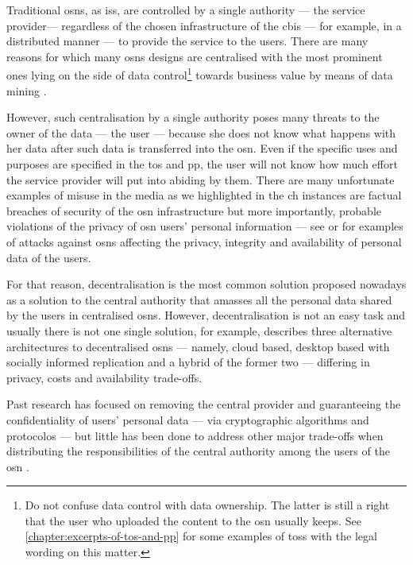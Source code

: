 \documentclass[showtrims, oldfontcommands]{kthesis}
\makeatletter
\newcommand\firstToLow[1]{%
 {%
   \renewcommand{\mfirstucMakeUppercase}{\MakeLowercase}%
   \makefirstuc{#1}%
 }%
}
\newcommand*{\lcnameref}[1]{%
 \begingroup 
   \let\label\@gobble
   \NR@setref{#1}\lc@thirdoffive{#1}%
  \endgroup
}
\newcommand{\lc@thirdoffive}[5]{\firstToLow{#3}}
\makeatother
\begin{document}
Traditional \acp{osn}, as \acp{is}, are controlled by a single authority --- the 
service provider--- regardless of the chosen infrastructure of the \ac{cbis} --- 
for example, in a distributed manner --- to provide the service to the users. There 
are many reasons for which many \acp{osn} designs are centralised with the most 
prominent ones lying on the side of data control\footnote{Do not confuse data control 
with data ownership. The latter is still a right that the user who uploaded the content 
to the \ac{osn} usually keeps. See \cref{chapter:excerpts-of-tos-and-pp} for some 
examples of \acp{tos} with the legal wording on this matter.} towards business value 
by means of data mining \cite{DomingosR01}.

However, such centralisation by a single authority poses many threats to the owner 
of the data --- the user --- because she does not know what happens with her data 
after such data is transferred into the \ac{osn}. Even if the specific uses and 
purposes are specified in the \ac{tos} and \ac{pp}, the user will not know how much 
effort the service provider will put into abiding by them. There are many unfortunate 
examples of misuse in the media as we highlighted in the \lcnameref{chapter:introduction}.
Such instances are factual breaches of security of the \ac{osn} infrastructure but 
more importantly, probable violations of the privacy of \ac{osn} users' personal 
information --- see \cite{CutilloMS10} or \cite{GaoHHWC11} for examples of attacks 
against \acp{osn} affecting the privacy, integrity and availability of personal 
data of the users.

For that reason, decentralisation is the most common solution proposed nowadays 
as a solution to the central authority that amasses all the personal data shared 
by the users in centralised \acp{osn}. However, decentralisation is not an easy 
task and usually there is not one single solution, for example, \cite{ShakimovVCC09} 
describes three alternative architectures to decentralised \acp{osn} --- namely, 
cloud based, desktop based with socially informed replication and a hybrid of the 
former two --- differing in privacy, costs and availability trade-offs. 

Past research has focused on removing the central provider and guaranteeing the 
confidentiality of users' personal data --- via cryptographic algorithms and protocolos 
--- but little has been done to address other major trade-offs when distributing 
the responsibilities of the central authority among the users of the \ac{osn} \cite{GreschbachKB12}
.%
\end{document}
